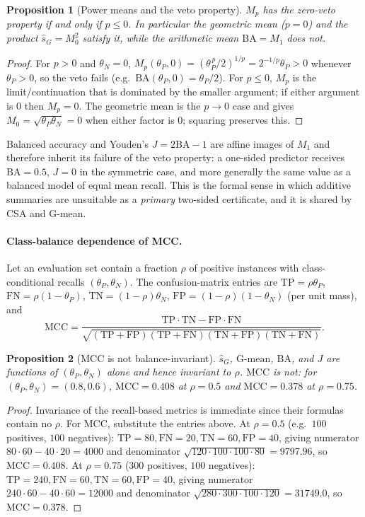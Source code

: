 \documentclass[10pt,conference]{IEEEtran}
\newtheorem{proposition}{Proposition}
\theoremstyle{remark}
\newcommand{\Gmean}{\mathrm{G\text{-}mean}}
\newcommand{\BA}{\mathrm{BA}}
\newcommand{\MCC}{\mathrm{MCC}}
\begin{document}
\begin{proposition}[Power means and the veto property]\label{prop:veto}
$M_p$ has the zero-veto property if and only if $p\le 0$.  In particular the geometric mean ($p=0$) and the product $\hat s_G=M_0^2$ satisfy it, while the arithmetic mean $\BA=M_1$ does not.
\end{proposition}
\begin{proof}
For $p>0$ and $\theta_N=0$, $M_p(\theta_P,0)=(\theta_P^{\,p}/2)^{1/p}=2^{-1/p}\theta_P>0$ whenever $\theta_P>0$, so the veto fails (e.g.\ $\BA(\theta_P,0)=\theta_P/2$).  For $p\le 0$, $M_p$ is the limit/continuation that is dominated by the smaller argument; if either argument is $0$ then $M_p=0$.  The geometric mean is the $p\to0$ case and gives $M_0=\sqrt{\theta_P\theta_N}=0$ when either factor is $0$; squaring preserves this.
\end{proof}

Balanced accuracy and Youden's $J=2\BA-1$ are affine images of $M_1$ and therefore inherit its failure of the veto property: a one-sided predictor receives $\BA=0.5$, $J=0$ in the symmetric case, and more generally the same value as a balanced model of equal mean recall.  This is the formal sense in which additive summaries are unsuitable as a \emph{primary} two-sided certificate, and it is shared by CSA and G-mean.

\paragraph{Class-balance dependence of MCC.}
Let an evaluation set contain a fraction $\rho$ of positive instances with class-conditional recalls $(\theta_P,\theta_N)$.  The confusion-matrix entries are $\mathrm{TP}=\rho\theta_P$, $\mathrm{FN}=\rho(1-\theta_P)$, $\mathrm{TN}=(1-\rho)\theta_N$, $\mathrm{FP}=(1-\rho)(1-\theta_N)$ (per unit mass), and
\[
\MCC=\frac{\mathrm{TP}\cdot\mathrm{TN}-\mathrm{FP}\cdot\mathrm{FN}}
{\sqrt{(\mathrm{TP}{+}\mathrm{FP})(\mathrm{TP}{+}\mathrm{FN})(\mathrm{TN}{+}\mathrm{FP})(\mathrm{TN}{+}\mathrm{FN})}}.
\]

\begin{proposition}[MCC is not balance-invariant]\label{prop:mcc}
$\hat s_G$, $\Gmean$, $\BA$, and $J$ are functions of $(\theta_P,\theta_N)$ alone and hence invariant to $\rho$.  $\MCC$ is not: for $(\theta_P,\theta_N)=(0.8,0.6)$, $\MCC=0.408$ at $\rho=0.5$ and $\MCC=0.378$ at $\rho=0.75$.
\end{proposition}
\begin{proof}
Invariance of the recall-based metrics is immediate since their formulas contain no $\rho$.  For MCC, substitute the entries above.  At $\rho=0.5$ (e.g.\ $100$ positives, $100$ negatives): $\mathrm{TP}{=}80,\mathrm{FN}{=}20,\mathrm{TN}{=}60,\mathrm{FP}{=}40$, giving numerator $80\cdot60-40\cdot20=4000$ and denominator $\sqrt{120\cdot100\cdot100\cdot80}=9797.96$, so $\MCC=0.408$.  At $\rho=0.75$ ($300$ positives, $100$ negatives): $\mathrm{TP}{=}240,\mathrm{FN}{=}60,\mathrm{TN}{=}60,\mathrm{FP}{=}40$, giving numerator $240\cdot60-40\cdot60=12000$ and denominator $\sqrt{280\cdot300\cdot100\cdot120}=31749.0$, so $\MCC=0.378$.
\end{proof}
\end{document}
